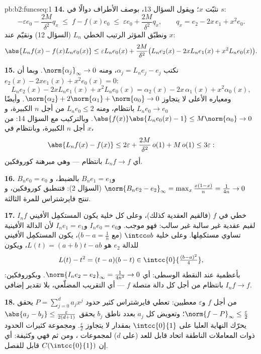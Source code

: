 \begin{solution}{pb:b2:funcseq:1}
\textbf{14.} نثبّت $x$؛ ويقول السؤال 13، بوصف الأطراف دوالًا في $s$:
\[
-\varepsilon e_0 - \frac{2M}{\delta^2}q_x
\;\leq\; f - f(x)e_0
\;\leq\; \varepsilon e_0 + \frac{2M}{\delta^2}q_x,
\qquad q_x = e_2 - 2x\,e_1 + x^2e_0 .
\]
ونطبّق المؤثر الرتيب الخطي $L_n$ (السؤال 12) ونقيّم عند
$x$:
\[
\abs{L_nf(x) - f(x)L_ne_0(x)}
\leq \varepsilon L_ne_0(x)
+ \frac{2M}{\delta^2}\bigl(L_ne_2(x) - 2xL_ne_1(x)
+ x^2L_ne_0(x)\bigr) .
\]

\textbf{15.} نكتب $\alpha_j = L_ne_j - e_j$، ومنه
$\norm{\alpha_j}_\infty \to 0$. وبما أن $e_2(x) - 2xe_1(x) +
x^2e_0(x) = 0$:
\[
L_ne_2(x) - 2xL_ne_1(x) + x^2L_ne_0(x)
= \alpha_2(x) - 2x\,\alpha_1(x) + x^2\alpha_0(x),
\]
ومعياره الأعلى لا يتجاوز $\norm{\alpha_2} + 2\norm{\alpha_1} +
\norm{\alpha_0} \to 0$. وأيضًا $L_ne_0 \to e_0$ بانتظام، ومنه
$L_ne_0 \leq 2$ من أجل $n$ الكبيرة، و$\abs{f(x)}\abs{L_ne_0(x) -
1} \leq M\norm{\alpha_0} \to 0$. وبالتركيب مع السؤال 14:
من أجل $n$ الكبيرة، وبانتظام في $x$،
\[
\abs{L_nf(x) - f(x)} \leq 2\varepsilon +
\frac{2M}{\delta^2}\,o(1) + M\,o(1) \leq 3\varepsilon :
\]
أي $L_nf \to f$ بانتظام --- وهي مبرهنة كوروفكين.

\textbf{16.} $B_ne_0 = e_0$ و$B_ne_1 = e_1$ بالضبط، و
$\norm{B_ne_2 - e_2}_\infty = \max_x\frac{x(1-x)}{n} =
\frac{1}{4n} \to 0$ (السؤال 2): فتنطبق كوروفكين، و
تنتج فايرشتراس للمرة الثالثة.

\textbf{17.} $I_nf$ خطي في $f$ (فالقيم العقدية كذلك)، وعلى
كل خلية يكون المستكمِل الأفيني لقيم عقدية غير سالبة
غير سالب: فهو موجب. و$I_ne_0 = e_0$ و$I_ne_1 = e_1$
لأن الدالة الأفينية تساوي مستكمِلها. وعلى
خلية $\intcc ab$ (مع $b - a = \frac1n$)، يكون المستكمِل الأفيني للدالة
$e_2$ هو $L(t) = (a+b)t - ab$، ويكون
\[
L(t) - t^2 = (t-a)(b-t) \in
\intcc{0}{\tfrac{(b-a)^2}{4}} ,
\]
بأعظمية عند النقطة الوسطى: أي $\norm{I_ne_2 - e_2}_\infty =
\frac{1}{4n^2} \to 0$. وبكوروفكين: $I_nf \to f$ بانتظام من أجل
كل دالة متصلة $f$ --- أي التقريب المضلّعي، بلا
تقدير إضافي.

\textbf{18.} من أجل $f$ و$\varepsilon$ معطيين: تعطي فايرشتراس
كثير حدود $P = \sum_{j=0}^d a_jx^j$ يحقق $\norm{f -
P}_\infty \leq \frac\varepsilon2$؛ وتعويض كل $a_j$ بعدد
ناطق $b_j$ يحقق $\abs{a_j - b_j} \leq
\frac{\varepsilon}{2(d+1)}$ يحرّك  النهاية العليا على
$\intcc{0}{1}$ بمقدار لا يتجاوز $\frac\varepsilon2$. ومجموعة
كثيرات الحدود ذوات المعاملات الناطقة اتحاد قابل للعد (على
$d$) لمجموعات ، ومن ثم فهي  وكثيفة:
أي إن $C(\intcc{0}{1})$ قابل للفصل.


\end{solution}
